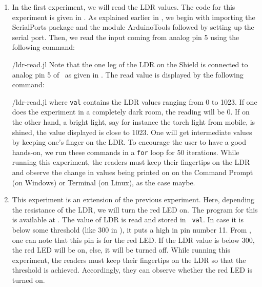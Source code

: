 \begin{enumerate}
  \item In the first experiment, we will read the LDR values. The code for this experiment is given in
        . As explained earlier in , we begin with importing the SerialPorts 
        \cite{julia-serial-ports} package and the module ArduinoTools followed by setting up the serial port.
        Then, we read the input coming from analog pin 5 using the 
        following command:
        
        {\LocLDRjuliacode/ldr-read.jl} Note that the one leg of the LDR on
        the Shield is connected to analog pin 5 of \arduino\, 
        as given in . The read value is displayed 
        by the following command: 
        
        {\LocLDRjuliacode/ldr-read.jl} where {\tt val} contains
        the LDR values ranging from 0 to 1023. If one does the experiment in a completely dark room, the
        reading will be 0. If on the other hand, a bright light, say for instance the torch
        light from mobile, is shined, the value displayed is close to 1023. One will get
        intermediate values by keeping one's finger on the LDR. To
        encourage the user to have a good hands-on, we run these commands in
        a {\tt for} loop for 50 iterations. While running this experiment, the readers must keep their fingertips on the LDR and
        observe the change in values being printed on on the
        Command Prompt (on Windows) or Terminal (on Linux), as the case maybe.
        
        
  \item This experiment is an extension of the previous experiment. Here, depending the resistance of the LDR, we will
        turn the red LED on.  The program for this is available at
        .  The value of LDR is read and stored in {\tt
            val}.  In case it is below some threshold (like 300 in ), 
        it puts a high in pin number 11. From , 
        one can note that this pin is for the red LED.  If the LDR value is below 300, 
        the red LED will be on, else, it will be turned off.  
        While running this experiment, the readers 
        must keep their fingertips on the LDR so that the threshold is achieved. Accordingly, 
        they can observe whether the red LED is turned on. 
\end{enumerate}

